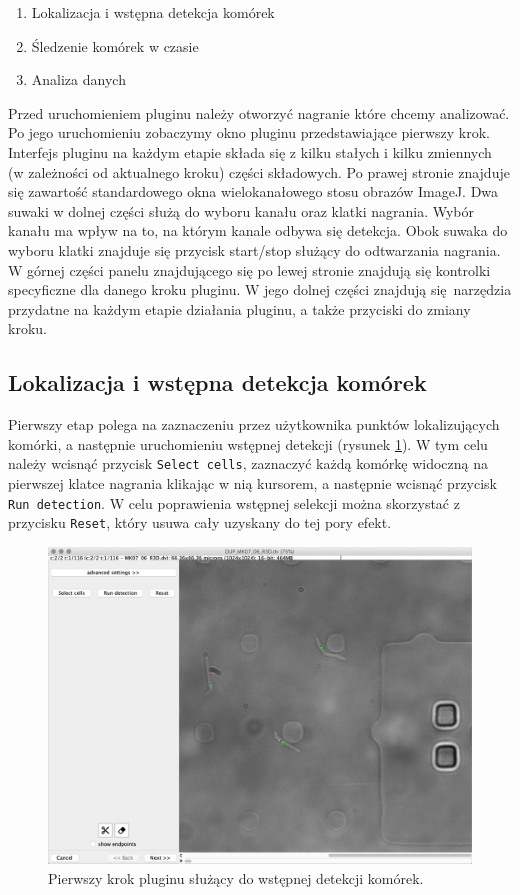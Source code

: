 \documentclass[declaration,shortabstract,mgr]{iithesis}
\begin{document}
\begin{enumerate}
  \item Lokalizacja i wstępna detekcja komórek
  \item Śledzenie komórek w czasie
  \item Analiza danych
\end{enumerate}

Przed uruchomieniem pluginu należy otworzyć nagranie które chcemy analizować. Po jego uruchomieniu zobaczymy okno pluginu przedstawiające pierwszy krok.
Interfejs pluginu na każdym etapie składa się z kilku stałych i kilku zmiennych (w zależności od aktualnego kroku) części składowych.
Po prawej stronie znajduje się zawartość standardowego okna wielokanałowego stosu obrazów ImageJ.
Dwa suwaki w dolnej części służą do wyboru kanału oraz klatki nagrania.
Wybór kanału ma wpływ na to, na którym kanale odbywa się detekcja.
Obok suwaka do wyboru klatki znajduje się przycisk start/stop służący do odtwarzania nagrania.
W górnej części panelu znajdującego się po lewej stronie znajdują się kontrolki specyficzne dla danego kroku pluginu. W jego dolnej części znajdują się narzędzia przydatne na każdym etapie działania pluginu, a także przyciski do zmiany kroku.


\subsection{Lokalizacja i wstępna detekcja komórek}

Pierwszy etap polega na zaznaczeniu przez użytkownika punktów lokalizujących komórki, a następnie uruchomieniu wstępnej detekcji (rysunek \ref{fig:ui-step-detector}).
W tym celu należy wcisnąć przycisk \texttt{Select cells}, zaznaczyć każdą komórkę widoczną na pierwszej klatce nagrania klikając w nią kursorem, a następnie wcisnąć przycisk \texttt{Run detection}.
W celu poprawienia wstępnej selekcji można skorzystać z przycisku \texttt{Reset}, który usuwa cały uzyskany do tej pory efekt.

\begin{figure}
  \centering
  \includegraphics[width=\textwidth]{images/ui-step-detector.png}
  \caption{Pierwszy krok pluginu służący do wstępnej detekcji komórek.}
  \label{fig:ui-step-detector}
\end{figure}
\end{document}
